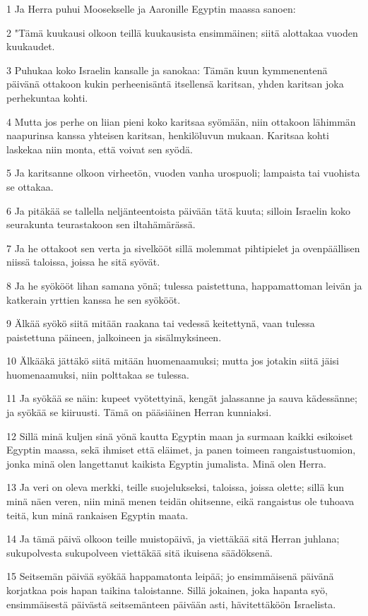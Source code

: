 \par 1 Ja Herra puhui Moosekselle ja Aaronille Egyptin maassa sanoen:
\par 2 "Tämä kuukausi olkoon teillä kuukausista ensimmäinen; siitä alottakaa vuoden kuukaudet.
\par 3 Puhukaa koko Israelin kansalle ja sanokaa: Tämän kuun kymmenentenä päivänä ottakoon kukin perheenisäntä itsellensä karitsan, yhden karitsan joka perhekuntaa kohti.
\par 4 Mutta jos perhe on liian pieni koko karitsaa syömään, niin ottakoon lähimmän naapurinsa kanssa yhteisen karitsan, henkilöluvun mukaan. Karitsaa kohti laskekaa niin monta, että voivat sen syödä.
\par 5 Ja karitsanne olkoon virheetön, vuoden vanha urospuoli; lampaista tai vuohista se ottakaa.
\par 6 Ja pitäkää se tallella neljänteentoista päivään tätä kuuta; silloin Israelin koko seurakunta teurastakoon sen iltahämärässä.
\par 7 Ja he ottakoot sen verta ja sivelkööt sillä molemmat pihtipielet ja ovenpäällisen niissä taloissa, joissa he sitä syövät.
\par 8 Ja he syökööt lihan samana yönä; tulessa paistettuna, happamattoman leivän ja katkerain yrttien kanssa he sen syökööt.
\par 9 Älkää syökö siitä mitään raakana tai vedessä keitettynä, vaan tulessa paistettuna päineen, jalkoineen ja sisälmyksineen.
\par 10 Älkääkä jättäkö siitä mitään huomenaamuksi; mutta jos jotakin siitä jäisi huomenaamuksi, niin polttakaa se tulessa.
\par 11 Ja syökää se näin: kupeet vyötettyinä, kengät jalassanne ja sauva kädessänne; ja syökää se kiiruusti. Tämä on pääsiäinen Herran kunniaksi.
\par 12 Sillä minä kuljen sinä yönä kautta Egyptin maan ja surmaan kaikki esikoiset Egyptin maassa, sekä ihmiset että eläimet, ja panen toimeen rangaistustuomion, jonka minä olen langettanut kaikista Egyptin jumalista. Minä olen Herra.
\par 13 Ja veri on oleva merkki, teille suojelukseksi, taloissa, joissa olette; sillä kun minä näen veren, niin minä menen teidän ohitsenne, eikä rangaistus ole tuhoava teitä, kun minä rankaisen Egyptin maata.
\par 14 Ja tämä päivä olkoon teille muistopäivä, ja viettäkää sitä Herran juhlana; sukupolvesta sukupolveen viettäkää sitä ikuisena säädöksenä.
\par 15 Seitsemän päivää syökää happamatonta leipää; jo ensimmäisenä päivänä korjatkaa pois hapan taikina taloistanne. Sillä jokainen, joka hapanta syö, ensimmäisestä päivästä seitsemänteen päivään asti, hävitettäköön Israelista.
